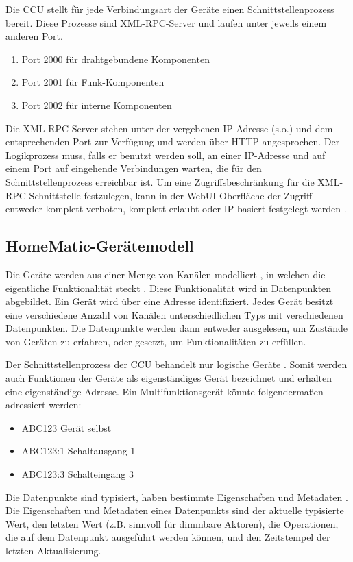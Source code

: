 Die CCU stellt für jede Verbindungsart der Geräte einen Schnittstellenprozess bereit.
Diese Prozesse sind XML-RPC-Server und laufen unter jeweils einem anderen Port.
\begin{enumerate}
\item Port 2000 für drahtgebundene Komponenten
\item Port 2001 für Funk-Komponenten
\item Port 2002 für interne Komponenten
\end{enumerate}
Die XML-RPC-Server stehen unter der vergebenen IP-Adresse (s.o.) und dem entsprechenden Port
zur Verfügung und werden über HTTP angesprochen.
Der Logikprozess muss, falls er benutzt werden soll, an einer IP-Adresse und auf einem Port auf
eingehende Verbindungen warten, die für den Schnittstellenprozess erreichbar ist.
Um eine Zugriffsbeschränkung für die XML-RPC-Schnittstelle festzulegen, kann in der WebUI-Oberfläche
der Zugriff entweder komplett verboten, komplett erlaubt oder IP-basiert festgelegt werden \cite[Seite 92]{homematic_webui_manual}.

\subsection{HomeMatic-Gerätemodell}
\label{gru_hm_obj}

Die Geräte werden aus einer Menge von Kanälen modelliert \cite[Seite 13]{hmscript2}, in welchen
die eigentliche Funktionalität steckt \cite[Seite 16]{hmscript2}.
Diese Funktionalität wird in Datenpunkten abgebildet.
Ein Gerät wird über eine Adresse identifiziert.
Jedes Gerät besitzt eine verschiedene Anzahl von Kanälen unterschiedlichen Typs mit
verschiedenen Datenpunkten.
Die Datenpunkte werden dann entweder ausgelesen, um Zustände von Geräten zu erfahren, oder gesetzt,
um Funktionalitäten zu erfüllen.

Der Schnittstellenprozess der CCU behandelt nur logische Geräte \cite{homematic_xmlrpc}.
Somit werden auch Funktionen der Geräte als eigenständiges Gerät bezeichnet und
erhalten eine eigenständige Adresse.
Ein Multifunktionsgerät könnte folgendermaßen adressiert werden:
\begin{itemize}
\item ABC123 Gerät selbst
\item ABC123:1 Schaltausgang 1
\item ABC123:3 Schalteingang 3
\end{itemize}

Die Datenpunkte sind typisiert, haben bestimmte Eigenschaften und Metadaten \cite[Seite 21]{hmscript2}.
Die Eigenschaften und Metadaten eines Datenpunkts sind der aktuelle typisierte Wert, den letzten Wert
(z.B. sinnvoll für dimmbare Aktoren), die Operationen, die auf dem Datenpunkt ausgeführt werden können,
und den Zeitstempel der letzten Aktualisierung.

